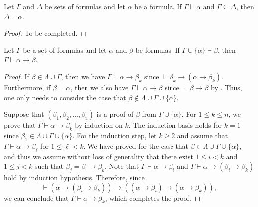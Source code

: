 \begin{proposition}
  Let $\Gamma$ and $\Delta$ be sets of formulas and let $\alpha$ be a formula.
  If $\Gamma \vdash \alpha$ and $\Gamma \subseteq \Delta$, then
  $\Delta \vdash \alpha$.
\end{proposition}
\begin{proof}
  To be completed.
\end{proof}

\begin{theorem}
  Let $\Gamma$ be a set of formulas and let $\alpha$ and $\beta$ be formulas.
  If $\Gamma \cup \{\alpha\} \vdash \beta$, then
  $\Gamma \vdash \alpha \to \beta$.
\end{theorem}
\begin{proof}
  If $\beta \in \Lambda \cup \Gamma$, then we have
  $\Gamma \vdash \alpha \to \beta_k$ since
  $\vdash \beta_k \to (\alpha \to \beta_k)$.
  Furthermore, if $\beta = \alpha$, then we also have
  $\Gamma \vdash \alpha \to \beta$ since $\vdash \beta \to \beta$ by
  .
  Thus, one only needs to consider the case that
  $\beta \notin \Lambda \cup \Gamma \cup \{\alpha\}$.

  Suppose that $(\beta_1, \beta_2, \dots, \beta_n)$ is a proof of $\beta$ from
  $\Gamma \cup \{\alpha\}$.
  For $1 \leq k \leq n$, we prove that $\Gamma \vdash \alpha \to \beta_k$ by
  induction on $k$.
  The induction basis holds for $k = 1$ since
  $\beta_1 \in \Lambda \cup \Gamma \cup \{\alpha\}$.
  For the induction step, let $k \geq 2$ and assume that
  $\Gamma \vdash \alpha \to \beta_\ell$ for $1 \leq \ell < k$.
  We have proved for the case that
  $\beta \in \Lambda \cup \Gamma \cup \{\alpha\}$, and thus we assume without
  loss of generality that there exist $1 \leq i < k$ and $1 \leq j < k$
  such that $\beta_j = \beta_i \to \beta_k$.
  Note that $\Gamma \vdash \alpha \to \beta_i$ and
  $\Gamma \vdash \alpha \to (\beta_i \to \beta_k)$
  hold by induction hypothesis.
  Therefore, since
  \begin{equation*}
    \vdash (\alpha \to (\beta_i \to \beta_k)) \to
    ((\alpha \to \beta_i) \to (\alpha \to \beta_k)),
  \end{equation*}
  we can conclude that $\Gamma \vdash \alpha \to \beta_k$,
  which completes the proof.
\end{proof}
